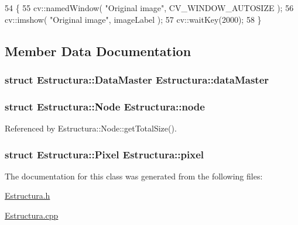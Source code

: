 \begin{DoxyCode}
54                                                \{
55     cv::namedWindow( \textcolor{stringliteral}{"Original image"}, CV\_WINDOW\_AUTOSIZE ); 
56     cv::imshow( \textcolor{stringliteral}{"Original image"}, imageLabel ); 
57     cv::waitKey(2000);
58 \}
\end{DoxyCode}


\subsection{Member Data Documentation}
\subsubsection[{\texorpdfstring{data\+Master}{dataMaster}}]{\setlength{\rightskip}{0pt plus 5cm}struct {\bf Estructura\+::\+Data\+Master}  Estructura\+::data\+Master}\hypertarget{classEstructura_ac594935213f660738514933d4a74f073}{}\label{classEstructura_ac594935213f660738514933d4a74f073}
\subsubsection[{\texorpdfstring{node}{node}}]{\setlength{\rightskip}{0pt plus 5cm}struct {\bf Estructura\+::\+Node}  Estructura\+::node}\hypertarget{classEstructura_a0b6ee5224146d9518cbfb9cc3cc6e8d9}{}\label{classEstructura_a0b6ee5224146d9518cbfb9cc3cc6e8d9}


Referenced by Estructura\+::\+Node\+::get\+Total\+Size().

\subsubsection[{\texorpdfstring{pixel}{pixel}}]{\setlength{\rightskip}{0pt plus 5cm}struct {\bf Estructura\+::\+Pixel}  Estructura\+::pixel}\hypertarget{classEstructura_a654a8d1db30bd97916e083a4f7a05666}{}\label{classEstructura_a654a8d1db30bd97916e083a4f7a05666}


The documentation for this class was generated from the following files\+:\begin{DoxyCompactItemize}
\item 
\hyperlink{Estructura_8h}{Estructura.\+h}\item 
\hyperlink{Estructura_8cpp}{Estructura.\+cpp}\end{DoxyCompactItemize}
